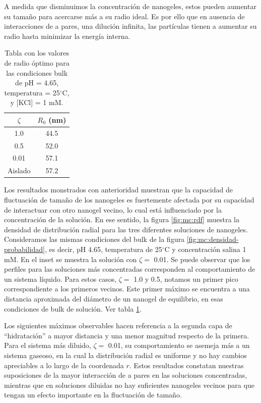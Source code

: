 	A medida que disminuimos la concentraci\'on de nanogeles, estos pueden aumentar su tama\~no para acercarse m\'as a su radio ideal. Es por ello que en ausencia de interacciones de a pares, una diluci\'on infinita, las part\'iculas tienen a aumentar su radio hasta minimizar la energ\'ia interna.
	
	
	\begin{table}[!htb]
		\centering
		\begin{tabular}{|c|c|} \hline  
			$\zeta$& $R_0$ (nm)\\ \hline  
			1.0& 44.5\\ \hline  
			0.5& 52.0\\ \hline  
			0.01& 57.1\\ \hline
			Aislado & 57.2 \\ \hline
		\end{tabular}
		\caption{Tabla con los valores de radio \'optimo para las condiciones bulk de pH = 4.65, temperatura = 25$^\circ$C, y [KCl] = 1 mM.}
		\label{tabla:mc:R-optimos}
	\end{table}
	
	Los resultados monstrados con anterioridad muestran que la capacidad de fluctuaci\'on de tama\~no de los nanogeles es fuertemente afectada por su capacidad de interactuar con otro nanogel vecino, lo cual est\'a influenciado por la concentraci\'on de la soluci\'on.
	En ese sentido, la figura \ref{fig:mc:rdf} muestra la densidad de distribuci\'on radial para las tres diferentes soluciones de nanogeles. Consideramos las mismas condiciones del bulk de la figura \ref{fig:mc:densidad-probabilidad}, es decir, pH 4.65, temperatura de 25$^\circ$C y concentraci\'on salina 1 mM.
	En el inset se muestra la solución con $\zeta =$ 0.01.
	Se puede observar que los perfiles para las soluciones m\'as concentradas corresponden al comportamiento de un sistema l\'iquido. Para estos casos, $\zeta = $ 1.0 y 0.5, notamos un primer pico correspondiente a los primeros vecinos. Este primer m\'aximo se encuentra a una distancia aproximada del di\'ametro de un nanogel de equilibrio, en esas condiciones de bulk de soluci\'on. Ver tabla \ref{tabla:mc:R-optimos}.
	
	Los siguientes m\'aximos observables hacen referencia a la segunda capa de ``hidrataci\'on'' a mayor distancia y una menor magnitud respecto de la primera.
	Para el sistema m\'as diluido, $\zeta =$ 0.01, su comportamiento se asemeja m\'as a un sistema gaseoso, en la cual la distribuci\'on radial es uniforme y no hay cambios apreciables a lo largo de la coordenada $r$.
	Estos resultados constatan nuestras suposiciones de la mayor interacci\'on de a pares en las soluciones concentradas, mientras que en soluciones diluidas no hay suficientes nanogeles vecinos para que tengan un efecto importante en la fluctuaci\'on de tama\~no.
	
